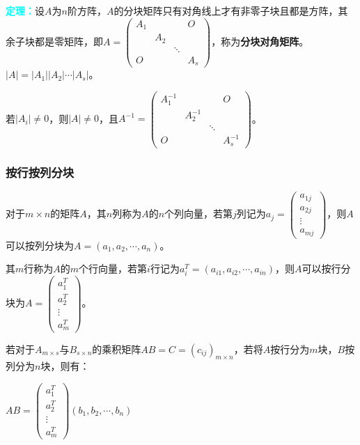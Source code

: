\documentclass[UTF8, 12pt]{ctexart}
\begin{document}
\textcolor{aqua}{\textbf{定理：}}设$A$为$n$阶方阵，$A$的分块矩阵只有对角线上才有非零子块且都是方阵，其余子块都是零矩阵，即$A=\left(
\begin{array}{cccc}
A_1 & & & O \\
& A_2 & \\
& & \ddots & \\
O & & & A_s
\end{array}
\right)$，称为\textbf{分块对角矩阵}。$\vert A\vert=\vert A_1\vert\vert A_2\vert\cdots\vert A_s\vert$。

若$\vert A_i\vert\neq0$，则$\vert A\vert\neq0$，且$A^{-1}=\left(
\begin{array}{cccc}
A_1^{-1} & & & O \\
& A_2^{-1} & \\
& & \ddots & \\
O & & & A_s^{-1}
\end{array}
\right)$。

\subsubsection{按行按列分块}

对于$m\times n$的矩阵$A$，其$n$列称为$A$的$n$个列向量，若第$j$列记为$a_j=\left(
\begin{array}{c}
a_{1j} \\
a_{2j} \\
\vdots \\
a_{mj}
\end{array}
\right)$，则$A$可以按列分块为$A=(a_1,a_2,\cdots,a_n)$。\medskip

其$m$行称为$A$的$m$个行向量，若第$i$行记为$a_i^T=(a_{i1},a_{i2},\cdots,a_{in})$，则$A$可以按行分块为$A=\left(\begin{array}{c}
a_1^T \\
a_2^T \\
\vdots \\
a_{m}^T
\end{array}\right)$。

若对于$A_{m\times s}$与$B_{s\times n}$的乘积矩阵$AB=C=(c_{ij})_{m\times n}$，若将$A$按行分为$m$块，$B$按列分为$n$块，则有：\medskip

$AB=\left(
\begin{array}{c}
a_1^T \\
a_2^T \\
\vdots \\
a_{m}^T
\end{array}
\right)(b_1,b_2,\cdots,b_n)$
\end{document}
